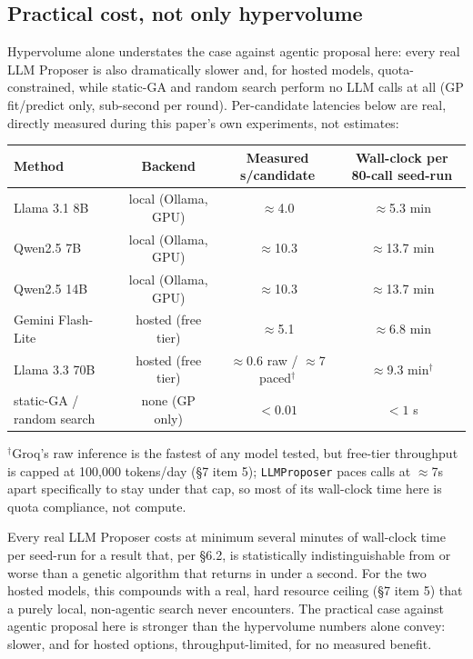 \documentclass{article}
\begin{document}
\subsection{Practical cost, not only hypervolume}

Hypervolume alone understates the case against agentic proposal here: every real LLM Proposer is
also dramatically slower and, for hosted models, quota-constrained, while static-GA and random
search perform no LLM calls at all (GP fit/predict only, sub-second per round). Per-candidate
latencies below are real, directly measured during this paper's own experiments, not estimates:

\begin{center}
\begin{tabular}{lccc}
\toprule
Method & Backend & Measured s/candidate & Wall-clock per 80-call seed-run \\
\midrule
Llama 3.1 8B & local (Ollama, GPU) & $\approx$4.0 & $\approx$5.3 min \\
Qwen2.5 7B & local (Ollama, GPU) & $\approx$10.3 & $\approx$13.7 min \\
Qwen2.5 14B & local (Ollama, GPU) & $\approx$10.3 & $\approx$13.7 min \\
Gemini Flash-Lite & hosted (free tier) & $\approx$5.1 & $\approx$6.8 min \\
Llama 3.3 70B & hosted (free tier) & $\approx$0.6 raw / $\approx$7 paced$^\dagger$ & $\approx$9.3 min$^\dagger$ \\
static-GA / random search & none (GP only) & $<0.01$ & $<1$ s \\
\bottomrule
\end{tabular}
\end{center}
{\footnotesize $^\dagger$Groq's raw inference is the fastest of any model tested, but free-tier
throughput is capped at 100,000 tokens/day (\S7 item 5); \texttt{LLMProposer} paces calls at
$\approx$7s apart specifically to stay under that cap, so most of its wall-clock time here is
quota compliance, not compute.}

Every real LLM Proposer costs at minimum several minutes of wall-clock time per seed-run for a
result that, per \S6.2, is statistically indistinguishable from or worse than a genetic algorithm
that returns in under a second. For the two hosted models, this compounds with a real, hard
resource ceiling (\S7 item 5) that a purely local, non-agentic search never encounters. The
practical case against agentic proposal here is stronger than the hypervolume numbers alone
convey: slower, and for hosted options, throughput-limited, for no measured benefit.
\end{document}
